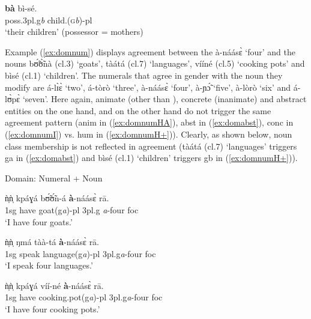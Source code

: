 \begin{exe}
\begin{exe}
\begin{exe}
\begin{exe}
\begin{exe}
\begin{exe}
\begin{exe}
\begin{exe}
\begin{exe}
\begin{exe}
\begin{exe}
\ex\label{ex:dompossH+}

\gll  \textbf{bà}   bì-sé.\\
     {\sc poss.3pl.g}{\it b}
{child.(\textsc{g}{\it b})-{\sc pl}}\\
\glt `their children' (possessor =  mothers) 

\z 
 \z
 
 
 Example (\ref{ex:domnum}) displays agreement between the  {\sls à-náásɛ̀} `four' and the nouns  {\sls bʊ̃́ʊ̃̀nà} ({\sc cl.3}) `goats',  {\sls tàátá} ({\sc cl.7}) `languages',  {\sls vííné} ({\sc cl.5}) `cooking pots' and  {\sls bìsé} ({\sc cl.1}) `children'. The  numerals that agree in gender with the noun they modify are  {\sls á-lɪ̀ɛ̀} `two', {\sls á-tòrò} `three',  {\sls à-náásɛ̀} `four',  {\sls à-ɲɔ̃́} `five', {\sls à-lòrò} `six' and  {\sls á-lʊ̀pɛ̀} `seven'. Here again, animate (other than ), concrete (inanimate) and abstract entities on the one hand, and  on the other hand do not trigger the same agreement pattern ({\sc anim} in (\ref{ex:domnumHA}), {\sc abst} in  (\ref{ex:domabst}),   {\sc conc} in (\ref{ex:domnumI})  vs. {\sc hum} in  (\ref{ex:domnumH+})). Clearly, as shown below, noun class membership is not reflected in agreement ({\sls tàátá} ({\sc cl.7}) `languages' triggers {\sc g}a in (\ref{ex:domabst}) and {\sls bìsé} ({\sc cl.1}) `children' triggers {\sc g}b in (\ref{ex:domnumH+})).
 
 \newpage 
\ea\label{ex:domnum}{\rm Domain: Numeral + Noun}\\
\ea\label{ex:domnumHA}

\gll  ǹ̩ǹ̩  kpáɣá  bʊ̃́ʊ̃́n-á  \textbf{à}-náásɛ̀ rā.\\
    {\sc 1sg}  {have}  {goat({\sc g}{\it a})-{\sc pl}}  {{\sc 3pl.g}{\it
a}-four} {\sc foc}\\
\glt `I have four goats.'\\

\ex\label{ex:domabst}

\gll   ǹ̩ǹ̩  ŋmá  tàà-tá \textbf{à}-náásɛ̀ rā.\\
  {\sc 1sg}  {speak}  {language({\sc g}{\it a})-{\sc pl}}   {{\sc
3pl.g}{\it a}-four} {\sc foc}\\
\glt `I speak four languages.'\\

\ex\label{ex:domnumI}

\gll  ǹ̩ǹ̩  kpáɣá  víí-né   \textbf{à}-náásɛ̀ rā.\\
  {\sc 1sg}  {have}  {cooking.pot({\sc g}{\it a})-{\sc pl}}   {{\sc 3pl.g}{\it a}-four}  {\sc foc}\\
\glt `I have four cooking pots.'\\


\end{exe}
\end{exe}
\end{exe}
\end{exe}
\end{exe}
\end{exe}
\end{exe}
\end{exe}
\end{exe}
\end{exe}
\end{exe}
